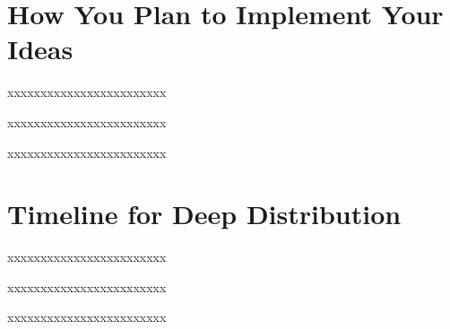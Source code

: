 \documentclass[UTF8]{article}
\begin{document}
\section*{How You Plan to Implement Your Ideas}
xxxxxxxxxxxxxxxxxxxxxxxx

xxxxxxxxxxxxxxxxxxxxxxxx

xxxxxxxxxxxxxxxxxxxxxxxx


\section*{Timeline for Deep Distribution}

xxxxxxxxxxxxxxxxxxxxxxxx

xxxxxxxxxxxxxxxxxxxxxxxx

xxxxxxxxxxxxxxxxxxxxxxxx



\small

% 
  
\end{document}
